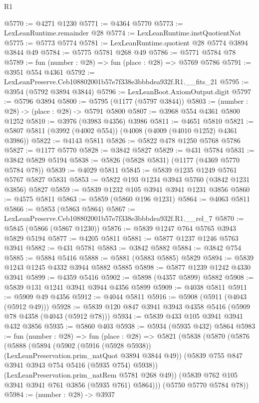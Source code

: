 \begin{lexlean}{R1}
\begin{coremodule}
@5770 := @4271 @1230
@5771 := @4364 @5770
@5773 := LexLeanRuntime.remainder @28
@5774 := LexLeanRuntime.instQuotientNat
@5775 := @5773 @5774
@5781 := LexLeanRuntime.quotient @28 @5774 @3894 @3844 @49
@5784 := @5775 @5781 @268 @49
@5786 := @5771 @5784 @78
@5789 := fun (number : @28) => fun (place : @28) => @5769 @5786
@5791 := @3951 @554 @4361
@5792 := LexLeanPreserve.Ceb108802001b57e7f338e3bbbdea932f.R1.__fits_21
@5795 := @3954 (@5792 @3894 @3844)
@5796 := LexLeanBoot.AxiomOutput.digit
@5797 := @5796 @3894
@5800 := @5795 (@1177 (@5797 @3844))
@5803 := (number : @28) -> (place : @28) -> @5791 @5800
@5807 := @3968 @554 @4361 @5800 @1252
@5810 := @3976 (@3983 @4356) @3986
@5811 := @4651 @5810
@5821 := @5807 @5811 (@3992 (@4002 @554)) (@4008 (@4009 (@4010 @1252) @4361 @3986))
@5822 := @4143 @5811
@5826 := @5822 @478 @1250 @5768 @5786
@5827 := @1177 @5770
@5828 := @3842 @5827
@5829 := @431 @5784
@5831 := @3842 @5829 @5194
@5838 := @5826 (@5828 @5831) (@1177 (@4369 @5770 @5784 @78))
@5839 := @4029 @5811
@5845 := @5839 @1235 @1249 @5761 @5767 @5827 @5831
@5853 := @5822 @193 @1234 @3943 @5760 (@3842 @1231 @3856) @5827
@5859 := @5839 @1232 @105 @3941 @3941 @1231 @3856
@5860 := @4575 @5811
@5863 := @5859 (@5860 @196 @1231)
@5864 := @4063 @5811
@5866 := @5853 (@5863 @5864)
@5867 := LexLeanPreserve.Ceb108802001b57e7f338e3bbbdea932f.R1.__rel_7
@5870 := @5845 (@5866 (@5867 @1230))
@5876 := @5839 @1247 @764 @5765 @3943 @5829 @5194
@5877 := @4205 @5811
@5881 := @5877 @1237 @1246 @5763 @3941
@5882 := @431 @5781
@5883 := @3842 @5882
@5884 := @3842 @754
@5885 := @5884 @5416
@5888 := @5881 (@5883 @5885) @5829
@5894 := @5839 @1243 @1245 @4332 @3944 @5882 @5885
@5898 := @5877 @1239 @1242 @4330 @3941
@5899 := @4359 @5416
@5902 := @5898 (@4357 @5899) @5882
@5908 := @5839 @131 @1241 @3941 @3944 @4356 @5899
@5909 := @4038 @5811
@5911 := @5909 @49 @4356
@5912 := @4044 @5811
@5916 := @5908 (@5911 (@4043 (@5912 @49)))
@5928 := @5839 @120 @847 @3941 @3943 @4358 @5416 (@5909 @78 @4358 (@4043 (@5912 @78)))
@5934 := @5839 @433 @105 @3941 @3941 @432 @3856
@5935 := @5860 @403
@5938 := @5934 (@5935 @432) @5864
@5983 := fun (number : @28) =>
  fun (place : @28) =>
  @5821
    (@5838
      (@5870
        (@5876
          (@5888
            (@5894
              (@5902 (@5916 (@5928 @5938)) (LexLeanPreservation.prim_natQuot @3894 @3844 @49))
              (@5839 @755 @847 @3941 @3943 @754 @5416 (@5935 @754) @5938))
            (LexLeanPreservation.prim_natRem @5781 @268 @49))
          (@5839 @762 @105 @3941 @3941 @761 @3856 (@5935 @761) @5864)))
      (@5750 @5770 @5784 @78))
@5984 := (number : @28) -> @3937

\end{coremodule}
\end{lexlean}
